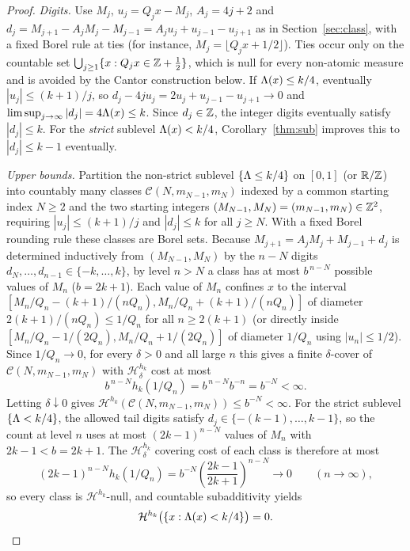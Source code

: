 \begin{proof}
\emph{Digits.} Use $M_j$, $u_j=Q_jx-M_j$, $A_j=4j+2$ and
$d_j=M_{j+1}-A_jM_j-M_{j-1}=A_ju_j+u_{j-1}-u_{j+1}$ as in
Section~\ref{sec:class}, with a fixed Borel rule at ties (for instance,
$M_j=\lfloor Q_jx+1/2\rfloor$). Ties occur only on the
countable set $\bigcup_{j\ge1}\{x:Q_jx\in\mathbb{Z}+\tfrac12\}$, which is null for every
non-atomic measure and is avoided by the Cantor construction below.
If $\Lambda(x)\le k/4$, eventually $|u_j|\le(k+1)/j$, so
$d_j-4ju_j=2u_j+u_{j-1}-u_{j+1}\to0$ and
$\limsup_{j\to\infty}|d_j|=4\Lambda(x)\le k$. Since $d_j\in\mathbb{Z}$, the integer digits
eventually satisfy $|d_j|\le k$. For the \emph{strict} sublevel $\Lambda(x)<k/4$,
Corollary~\ref{thm:sub} improves this to $|d_j|\le k-1$ eventually.

\emph{Upper bounds.} Partition the non-strict sublevel $\{\Lambda\le k/4\}$ on
$[0,1]$ (or $\mathbb{R}/\mathbb{Z}$) into countably many classes
$\mathcal C(N,m_{N-1},m_N)$ indexed by a common starting index $N\ge2$ and the
two starting integers $(M_{N-1},M_N)=(m_{N-1},m_N)\in\mathbb{Z}^2$, requiring
$|u_j|\le(k+1)/j$ and $|d_j|\le k$ for all $j\ge N$. With a fixed Borel rounding
rule these classes are Borel sets. Because $M_{j+1}=A_jM_j+M_{j-1}+d_j$ is
determined inductively from $(M_{N-1},M_N)$ by the $n-N$ digits
$d_N,\dots,d_{n-1}\in\{-k,\dots,k\}$, by level $n>N$ a class has at most
$b^{\,n-N}$ possible values of $M_n$ ($b=2k+1$). Each value of $M_n$ confines
$x$ to the interval $[M_n/Q_n-(k+1)/(nQ_n),M_n/Q_n+(k+1)/(nQ_n)]$ of diameter
$2(k+1)/(nQ_n)\le1/Q_n$ for all $n\ge2(k+1)$ (or directly inside
$[M_n/Q_n-1/(2Q_n),M_n/Q_n+1/(2Q_n)]$ of diameter $1/Q_n$ using $|u_n|\le1/2$).
Since $1/Q_n\to0$, for every $\delta>0$ and all large $n$ this gives a finite
$\delta$-cover of $\mathcal C(N,m_{N-1},m_N)$ with $\mathcal H_\delta^{h_k}$
cost at most
\[
b^{\,n-N}h_k(1/Q_n)=b^{\,n-N}b^{-n}=b^{-N}<\infty.
\]
Letting $\delta\downarrow0$ gives
$\mathcal H^{h_k}(\mathcal C(N,m_{N-1},m_N))\le b^{-N}<\infty$. For the strict
sublevel $\{\Lambda<k/4\}$, the allowed tail digits satisfy
$d_j\in\{-(k-1),\dots,k-1\}$, so the count at level $n$ uses at most
$(2k-1)^{n-N}$ values of $M_n$ with $2k-1<b=2k+1$. The $\mathcal H_\delta^{h_k}$
covering cost of each class is therefore at most
\[
(2k-1)^{n-N}h_k(1/Q_n)=b^{-N}\left(\frac{2k-1}{2k+1}\right)^{n-N}\longrightarrow0
\qquad(n\to\infty),
\]
so every class is $\mathcal H^{h_k}$-null, and countable subadditivity yields
\begin{equation}\label{eq:strict-null}
 \mathcal H^{h_k}\bigl(\{x:\Lambda(x)<k/4\}\bigr)=0 .
\end{equation}


\end{proof}
